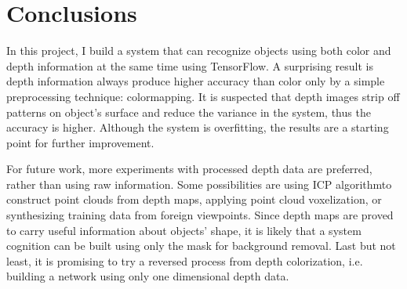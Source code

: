 \section{Conclusions}\label{sec:conclusions}

In this project, I build a system that can recognize objects using both color and depth information at the same time using TensorFlow. A surprising result is depth information always produce higher accuracy than color only by a simple preprocessing technique: colormapping. It is suspected that depth images strip off patterns on object's surface and reduce the variance in the system, thus the accuracy is higher. Although the system is overfitting, the results are a starting point for further improvement. 

For future work, more experiments with processed depth data are preferred, rather than using raw information. Some possibilities are using ICP algorithmto construct point clouds from depth maps, applying point cloud voxelization, or synthesizing training data from foreign viewpoints. Since depth maps are proved to carry useful information about objects' shape, it is likely that a system cognition can be built using only the mask for background removal. Last but not least, it is promising to try a reversed process from depth colorization, i.e. building a network using only one dimensional depth data.